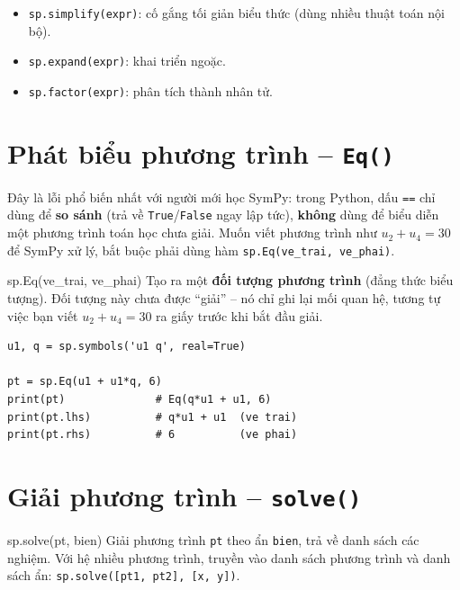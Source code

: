 \documentclass[12pt,a4paper]{report}
\newcommand{\pycmd}[1]{\texttt{\color{kw}#1}}
\begin{document}
\begin{itemize}
  \item \pycmd{sp.simplify(expr)}: cố gắng tối giản biểu thức (dùng
  nhiều thuật toán nội bộ).
  \item \pycmd{sp.expand(expr)}: khai triển ngoặc.
  \item \pycmd{sp.factor(expr)}: phân tích thành nhân tử.
\end{itemize}

\section{Phát biểu phương trình -- \texttt{Eq()}}

\begin{warnbox}
Đây là lỗi phổ biến nhất với người mới học SymPy: trong Python, dấu
\texttt{==} chỉ dùng để \textbf{so sánh} (trả về \texttt{True}/\texttt{False}
ngay lập tức), \textbf{không} dùng để biểu diễn một phương trình toán
học chưa giải. Muốn viết phương trình như $u_2 + u_4 = 30$ để SymPy xử
lý, bắt buộc phải dùng hàm \texttt{sp.Eq(ve\_trai, ve\_phai)}.
\end{warnbox}

\begin{syntaxbox}{sp.Eq(ve\_trai, ve\_phai)}
Tạo ra một \textbf{đối tượng phương trình} (đẳng thức biểu tượng). Đối
tượng này chưa được ``giải'' -- nó chỉ ghi lại mối quan hệ, tương tự
việc bạn viết $u_2 + u_4 = 30$ ra giấy trước khi bắt đầu giải.
\end{syntaxbox}

\begin{lstlisting}[caption={Tạo và quan sát phương trình}]
u1, q = sp.symbols('u1 q', real=True)

pt = sp.Eq(u1 + u1*q, 6)
print(pt)              # Eq(q*u1 + u1, 6)
print(pt.lhs)          # q*u1 + u1  (ve trai)
print(pt.rhs)          # 6          (ve phai)
\end{lstlisting}

\section{Giải phương trình -- \texttt{solve()}}

\begin{syntaxbox}{sp.solve(pt, bien)}
Giải phương trình \texttt{pt} theo ẩn \texttt{bien}, trả về danh sách
các nghiệm. Với hệ nhiều phương trình, truyền vào danh sách phương
trình và danh sách ẩn:
\texttt{sp.solve([pt1, pt2], [x, y])}.
\end{syntaxbox}
\end{document}
